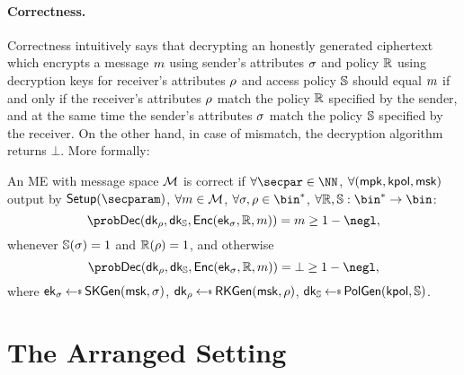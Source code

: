 \paragraph*{Correctness.} Correctness intuitively says that decrypting an honestly generated ciphertext which encrypts a message $m$ using sender's attributes $\sigma$ and policy $\mathbb{R}$ using decryption keys for receiver's attributes $\rho$ and access policy $\mathbb{S}$ should equal $m$ if and only if the receiver's attributes $\rho$ match the policy $\mathbb{R}$ specified by the sender, and at the same time the sender's attributes $\sigma$ match the policy $\mathbb{S}$ specified by the receiver. On the other hand, in case of mismatch, the decryption algorithm returns $\bot$.
More formally:
\begin{definition}[Correctness of ME]\label{def:DNISHcorrectness}
    An ME with message space $\mathcal{M}$ is correct if $\forall\secpar\in\NN$, $\forall (\mathsf{mpk}, \mathsf{kpol}, \mathsf{msk})$ output by $\setup(\secparam)$,
    $\forall m \in \mathcal{M}$, $\forall \sattr,\rattr \in \bin^*$,
    $\forall \raccess,\saccess:\bin^*\rightarrow\bin$:
    \[
        \Prob{\dec(\dk_{\rattr}, \dk_{\saccess}, \enc(\ek_{\sattr}, \raccess, \msg)) = \msg} \geq 1 - \negl,
    \]
    whenever $\mathbb{S}(\sigma)=1$ and $\mathbb{R}(\rho)=1$, and otherwise
    \[
        \Prob{\dec(\dk_{\rattr}, \dk_{\saccess}, \enc(\ek_{\sattr}, \raccess, \msg)) = \bot} \geq 1 - \negl,
    \]
    where $\ek_{\sattr} \getsr \skgen(\msk, \sattr)$, $\dk_{\rattr} \getsr \rkgen(\allowbreak\msk, \rattr)$, $\dk_{\saccess} \getsr \polgen(\kpol, \saccess)$.
\end{definition}

\section{The Arranged Setting}
